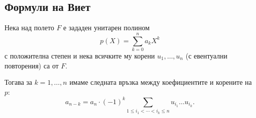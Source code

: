 \documentclass{../../common/topic}
\begin{document}
\subsection{Формули на Виет}

\begin{theorem}\label{thm:vietas_formulas}
  Нека над полето \( F \) е зададен унитарен полином
  \begin{equation*}
    p(X) = \sum_{k=0}^n a_k X^k
  \end{equation*}
  с положителна степен и нека всичките му корени \( u_1, \ldots, u_n \) (с евентуални повторения) са от \( F \).

  Тогава за \( k = 1, \ldots, n \) имаме следната връзка между коефициентите и корените на \( p \):
  \begin{equation*}
    a_{n-k} = a_n \cdot {(-1)}^k \sum_{1 \leq i_1 < \cdots < i_k \leq n} u_{i_1} \ldots u_{i_k}.
  \end{equation*}
\end{theorem}
\end{document}
